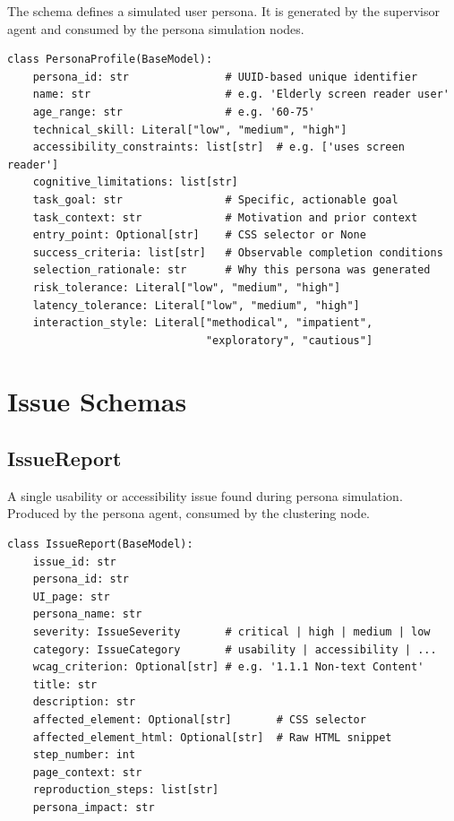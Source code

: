 The  schema defines a simulated user persona. It is generated by the supervisor agent and consumed by the persona simulation nodes.

\begin{lstlisting}[caption={PersonaProfile Pydantic model (from \filepath{schemas/persona\_schema.py}).}, label={lst:personaprofile}]
class PersonaProfile(BaseModel):
    persona_id: str               # UUID-based unique identifier
    name: str                     # e.g. 'Elderly screen reader user'
    age_range: str                # e.g. '60-75'
    technical_skill: Literal["low", "medium", "high"]
    accessibility_constraints: list[str]  # e.g. ['uses screen reader']
    cognitive_limitations: list[str]
    task_goal: str                # Specific, actionable goal
    task_context: str             # Motivation and prior context
    entry_point: Optional[str]    # CSS selector or None
    success_criteria: list[str]   # Observable completion conditions
    selection_rationale: str      # Why this persona was generated
    risk_tolerance: Literal["low", "medium", "high"]
    latency_tolerance: Literal["low", "medium", "high"]
    interaction_style: Literal["methodical", "impatient",
                               "exploratory", "cautious"]
\end{lstlisting}


\section{Issue Schemas}
\label{app:issue-schemas}

\subsection{IssueReport}

A single usability or accessibility issue found during persona simulation. Produced by the persona agent, consumed by the clustering node.

\begin{lstlisting}[caption={IssueReport Pydantic model (from \filepath{schemas/issue\_schema.py}).}, label={lst:issuereport}]
class IssueReport(BaseModel):
    issue_id: str
    persona_id: str
    UI_page: str
    persona_name: str
    severity: IssueSeverity       # critical | high | medium | low
    category: IssueCategory       # usability | accessibility | ...
    wcag_criterion: Optional[str] # e.g. '1.1.1 Non-text Content'
    title: str
    description: str
    affected_element: Optional[str]       # CSS selector
    affected_element_html: Optional[str]  # Raw HTML snippet
    step_number: int
    page_context: str
    reproduction_steps: list[str]
    persona_impact: str
\end{lstlisting}

